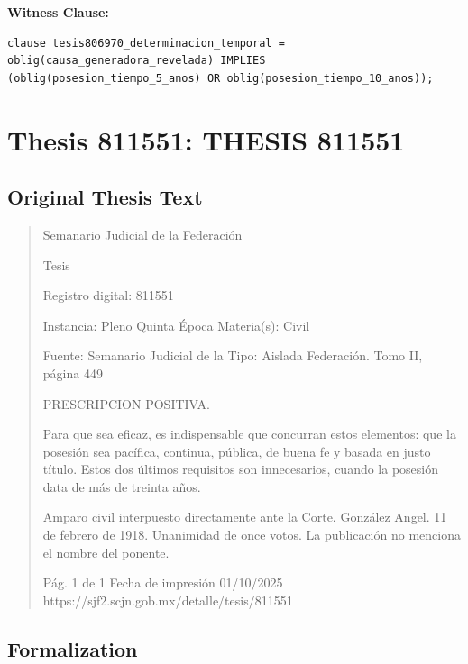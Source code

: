 \documentclass[11pt,a4paper]{article}
\begin{document}
\textbf{Witness Clause:}

\begin{lstlisting}[style=witnessstyle, language=Witness]
clause tesis806970_determinacion_temporal = oblig(causa_generadora_revelada) IMPLIES (oblig(posesion_tiempo_5_anos) OR oblig(posesion_tiempo_10_anos));
\end{lstlisting}

\newpage

\section{Thesis 811551: THESIS 811551}
\label{thesis:811551}

\subsection{Original Thesis Text}

\begin{quote}
                                                   Semanario Judicial de la Federación

                                                  Tesis

 Registro digital: 811551

 Instancia: Pleno                 Quinta Época                         Materia(s): Civil

                                  Fuente: Semanario Judicial de la     Tipo: Aislada
                                  Federación.
                                  Tomo II, página 449


PRESCRIPCION POSITIVA.


Para que sea eficaz, es indispensable que concurran estos elementos: que la posesión sea pacífica,
continua, pública, de buena fe y basada en justo título. Estos dos últimos requisitos son
innecesarios, cuando la posesión data de más de treinta años.


Amparo civil interpuesto directamente ante la Corte. González Angel. 11 de febrero de 1918.
Unanimidad de once votos. La publicación no menciona el nombre del ponente.




                                             Pág. 1 de 1             Fecha de impresión 01/10/2025
  https://sjf2.scjn.gob.mx/detalle/tesis/811551

\end{quote}

\subsection{Formalization}
\end{document}
